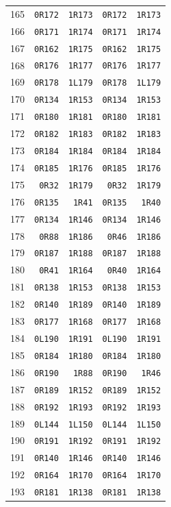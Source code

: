 \begin{longtable}{rrrrr}
165 & \texttt{0R172} & \texttt{1R173} & \texttt{0R172} & \texttt{1R173}\\
166 & \texttt{0R171} & \texttt{1R174} & \texttt{0R171} & \texttt{1R174}\\
167 & \texttt{0R162} & \texttt{1R175} & \texttt{0R162} & \texttt{1R175}\\
168 & \texttt{0R176} & \texttt{1R177} & \texttt{0R176} & \texttt{1R177}\\
169 & \texttt{0R178} & \texttt{1L179} & \texttt{0R178} & \texttt{1L179}\\
170 & \texttt{0R134} & \texttt{1R153} & \texttt{0R134} & \texttt{1R153}\\
171 & \texttt{0R180} & \texttt{1R181} & \texttt{0R180} & \texttt{1R181}\\
172 & \texttt{0R182} & \texttt{1R183} & \texttt{0R182} & \texttt{1R183}\\
173 & \texttt{0R184} & \texttt{1R184} & \texttt{0R184} & \texttt{1R184}\\
174 & \texttt{0R185} & \texttt{1R176} & \texttt{0R185} & \texttt{1R176}\\
175 & \texttt{0R32} & \texttt{1R179} & \texttt{0R32} & \texttt{1R179}\\
176 & \texttt{0R135} & \texttt{1R41} & \texttt{0R135} & \texttt{1R40}\\
177 & \texttt{0R134} & \texttt{1R146} & \texttt{0R134} & \texttt{1R146}\\
178 & \texttt{0R88} & \texttt{1R186} & \texttt{0R46} & \texttt{1R186}\\
179 & \texttt{0R187} & \texttt{1R188} & \texttt{0R187} & \texttt{1R188}\\
180 & \texttt{0R41} & \texttt{1R164} & \texttt{0R40} & \texttt{1R164}\\
181 & \texttt{0R138} & \texttt{1R153} & \texttt{0R138} & \texttt{1R153}\\
182 & \texttt{0R140} & \texttt{1R189} & \texttt{0R140} & \texttt{1R189}\\
183 & \texttt{0R177} & \texttt{1R168} & \texttt{0R177} & \texttt{1R168}\\
184 & \texttt{0L190} & \texttt{1R191} & \texttt{0L190} & \texttt{1R191}\\
185 & \texttt{0R184} & \texttt{1R180} & \texttt{0R184} & \texttt{1R180}\\
186 & \texttt{0R190} & \texttt{1R88} & \texttt{0R190} & \texttt{1R46}\\
187 & \texttt{0R189} & \texttt{1R152} & \texttt{0R189} & \texttt{1R152}\\
188 & \texttt{0R192} & \texttt{1R193} & \texttt{0R192} & \texttt{1R193}\\
189 & \texttt{0L144} & \texttt{1L150} & \texttt{0L144} & \texttt{1L150}\\
190 & \texttt{0R191} & \texttt{1R192} & \texttt{0R191} & \texttt{1R192}\\
191 & \texttt{0R140} & \texttt{1R146} & \texttt{0R140} & \texttt{1R146}\\
192 & \texttt{0R164} & \texttt{1R170} & \texttt{0R164} & \texttt{1R170}\\
193 & \texttt{0R181} & \texttt{1R138} & \texttt{0R181} & \texttt{1R138}\\
\bottomrule\end{longtable}
\endgroup
